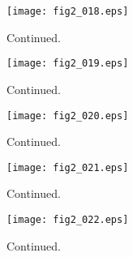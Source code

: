 \documentclass[preprint]{aastex}
\begin{document}
\setcounter{figure}{1}
\begin{figure}[t]
\centering
\texttt{[image: fig2\_018.eps]}
\caption{
Continued. 
}
\label{Fig2}
\end{figure}
\clearpage



\setcounter{figure}{1}
\begin{figure}[t]
\centering
\texttt{[image: fig2\_019.eps]}
\caption{
Continued. 
}
\label{Fig2}
\end{figure}
\clearpage



\setcounter{figure}{1}
\begin{figure}[t]
\centering
\texttt{[image: fig2\_020.eps]}
\caption{
Continued. 
}
\label{Fig2}
\end{figure}
\clearpage



\setcounter{figure}{1}
\begin{figure}[t]
\centering
\texttt{[image: fig2\_021.eps]}
\caption{
Continued. 
}
\label{Fig2}
\end{figure}
\clearpage



\setcounter{figure}{1}
\begin{figure}[t]
\centering
\texttt{[image: fig2\_022.eps]}
\caption{
Continued. 
}
\label{Fig2}
\end{figure}
\clearpage
\end{document}
